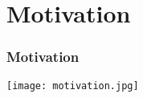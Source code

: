 
\section{Motivation}

\begin{frame}
\frametitle{Motivation}
\begin{center}
\texttt{[image: motivation.jpg]}  
\end{center}
\end{frame}
